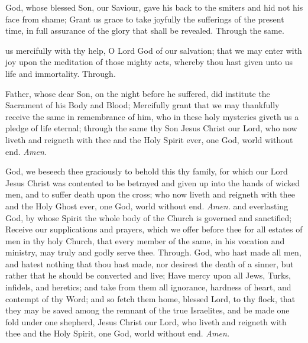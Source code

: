 	 God, whose blessed Son, our Saviour, gave his back to the smiters and hid not his face from shame; Grant us grace to take joyfully the sufferings of the present time, in full assurance of the glory that shall be revealed. Through the same.
	
     us mercifully with thy help, O Lord God of our salvation; that we may enter with joy upon the meditation of those mighty acts, whereby thou hast given unto us life and immortality. Through.
	
     Father, whose dear Son, on the night before he suffered, did institute the Sacrament of his Body and Blood; Mercifully grant that we may thankfully receive the same in remembrance of him, who in these holy mysteries giveth us a pledge of life eternal; through the same thy Son Jesus Christ our Lord, who now liveth and reigneth with thee and the Holy Spirit ever, one God, world without end. \textit{Amen.}
    
     God, we beseech thee graciously to behold this thy family, for which our Lord Jesus Christ was contented to be betrayed and given up into the hands of wicked men, and to suffer death upon the cross; who now liveth and reigneth with thee and the Holy Ghost ever, one God, world without end. \textit{Amen.}
     and everlasting God, by whose Spirit the whole body of the Church is governed and sanctified; Receive our supplications and prayers, which we offer before thee for all estates of men in thy holy Church, that every member of the same, in his vocation and ministry, may truly and godly serve thee. Through.
     God, who hast made all men, and hatest nothing that thou hast made, nor desirest the death of a sinner, but rather that he should be converted and live; Have mercy upon all Jews, Turks, infidels, and heretics; and take from them all ignorance, hardness of heart, and contempt of thy Word; and so fetch them home, blessed Lord, to thy flock, that they may be saved among the remnant of the true Israelites, and be made one fold under one shepherd, Jesus Christ our Lord, who liveth and reigneth with thee and the Holy Spirit, one God, world without end. \textit{Amen.}
    
    \clearpage
    

